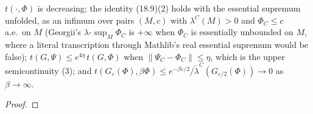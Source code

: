 \begin{lemma}[Georgii (18.9)]
    \label{lem:lo-18-9}
    \leanok

    $t(\cdot,\Phi)$ is decreasing; the identity (18.9)(2) holds with the essential supremum
    unfolded, as an infimum over pairs $(M, c)$ with $\lambda^C(M) > 0$ and $\Phi_C \leq c$ a.e.\ on
    $M$ (Georgii's $\lambda$-$\sup_M\Phi_C$ is $+\infty$ when $\Phi_C$ is essentially unbounded on
    $M$, where a literal transcription through Mathlib's real essential supremum would be false);
    $t(G,\Psi) \leq e^{4\eta}\,t(G,\Phi)$ when $\|\Psi_C - \Phi_C\| \leq \eta$, which is the
    upper semicontinuity (3); and $t(G_\varepsilon(\Phi),\beta\Phi) \leq
    e^{-\beta\varepsilon/2}/\tilde\lambda^C(G_{\varepsilon/2}(\Phi)) \to 0$ as $\beta \to \infty$.
\end{lemma}
\begin{proof}
    \leanok
\end{proof}

